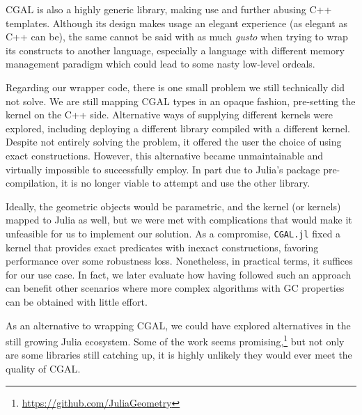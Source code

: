 \Ac{CGAL} is also a highly generic library, making use and further abusing C++
templates.  Although its design makes usage an elegant experience (as elegant as
C++ can be), the same cannot be said with as much \emph{gusto} when trying to
wrap its constructs to another language, especially a language with different
memory management paradigm which could lead to some nasty low-level ordeals.

Regarding our wrapper code,  there is one small problem we still technically did
not solve.  We are still mapping \ac{CGAL} types in an opaque fashion,
pre-setting the kernel on the C++ side.  Alternative ways of supplying different
kernels were explored, including deploying a different library compiled with a
different kernel.  Despite not entirely solving the problem, it offered the user
the choice of using exact constructions.  However, this alternative became
unmaintainable and virtually impossible to successfully employ.  In part due to
Julia's package pre-compilation, it is no longer viable to attempt and use the
other library.

Ideally, the geometric objects would be parametric, and the kernel (or kernels)
mapped to Julia as well, but we were met with complications that would make it
unfeasible for us to implement our solution.  As a compromise, \texttt{CGAL.jl}
fixed a kernel that provides exact predicates with inexact constructions,
favoring performance over some robustness loss.  Nonetheless, in practical
terms, it suffices for our use case.  In fact, we later evaluate how having
followed such an approach can benefit other scenarios where more complex
algorithms with \ac{GC} properties can be obtained with little effort.

As an alternative to wrapping \ac{CGAL}, we could have explored alternatives in
the still growing Julia ecosystem.  Some of the work seems
promising,\footnote{\url{https://github.com/JuliaGeometry}} but not only are
some libraries still catching up, it is highly unlikely they would ever meet the
quality of \ac{CGAL}.

